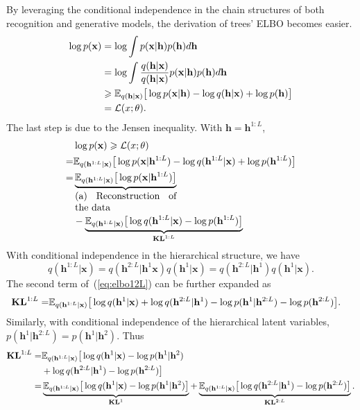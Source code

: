 \documentclass[sigconf, anonymous, review]{acmart}
\theoremstyle{plain}
\theoremstyle{definition}
\theoremstyle{remark}
\begin{document}
By leveraging  the conditional independence  in the chain structures of both recognition and generative models, the derivation of trees' ELBO becomes easier.
\begin{align*}
\log p(\mathbf{x}) &= \log \int p(\mathbf{x}|\mathbf{h})p(\mathbf{h}) d \mathbf{h} \\
&= \log \int \frac{q(\mathbf{h}|\mathbf{x})}{q(\mathbf{h}|\mathbf{x})} p(\mathbf{x}|\mathbf{h})p(\mathbf{h}) d \mathbf{h} \\
& \geqslant \mathbb{E}_{q(\mathbf{h}|\mathbf{x})}\big[ \log p(\mathbf{x}|\mathbf{h}) -  \log q(\mathbf{h}|\mathbf{x}) +  \log p(\mathbf{h}) \big]\\ \notag
&= \mathcal{L}(x; \theta).
\end{align*}%
The last step is due to the Jensen inequality. With $\mathbf{h} =\mathbf{h}^{1:L} $, 
\begin{align} \notag  %
&\log p(\mathbf{x})  \geqslant  \mathcal{L}(x; \theta) \\ \notag
=& \mathbb{E}_{q(\mathbf{h}^{1:L}|\mathbf{x})}\big[ \log p(\mathbf{x}|\mathbf{h}^{1:L}) -  \log q(\mathbf{h}^{1:L}|\mathbf{x}) +  \log p(\mathbf{h}^{1:L}) \big] \\ \label{eq:elbo12L}
=&  \underbrace{\mathbb{E}_{q(\mathbf{h}^{1:L}|\mathbf{x})}\big[ \log p(\mathbf{x}|\mathbf{h}^{1:L})\big]}_{\parbox{10.5em}{(a) Reconstruction of the data}}  \\ \notag
&-  \underbrace{\mathbb{E}_{q(\mathbf{h}^{1:L}|\mathbf{x})}\big[ \log q(\mathbf{h}^{1:L}|\mathbf{x}) - \log p(\mathbf{h}^{1:L}) \big] }_{\textbf{\text{KL}}^{1:L}}
\end{align}%
With conditional independence in   the hierarchical structure, we have 
$$q(\mathbf{h}^{1:L}|\mathbf{x})=q(\mathbf{h}^{2:L}|\mathbf{h}^1\mathbf{x})q(\mathbf{h}^{1}|\mathbf{x})=q(\mathbf{h}^{2:L}|\mathbf{h}^1)q(\mathbf{h}^{1}|\mathbf{x}).$$
The second term of~(\ref{eq:elbo12L}) can be further expanded as 
 \begin{align} \notag 
\textbf{\text{KL}}^{1:L} =&  \mathbb{E}_{q(\mathbf{h}^{1:L}|\mathbf{x})}\big[  \log q(\mathbf{h}^{1}|\mathbf{x})  +  \log q(\mathbf{h}^{2:L}|\mathbf{h}^{1})  - \log p(\mathbf{h}^{1}|\mathbf{h}^{2:L}) - \log p(\mathbf{h}^{2:L})  \big].
\end{align}%
Similarly, with conditional independence of the hierarchical latent variables, $ p(\mathbf{h}^{1}|\mathbf{h}^{2:L})= p(\mathbf{h}^{1}|\mathbf{h}^{2})$. Thus
 \begin{align} \notag 
\textbf{\text{KL}}^{1:L} =&  \mathbb{E}_{q(\mathbf{h}^{1:L}|\mathbf{x})}\big[  \log q(\mathbf{h}^{1}|\mathbf{x})   - \log p(\mathbf{h}^{1}|\mathbf{h}^{2})  \\
&+  \log q(\mathbf{h}^{2:L}|\mathbf{h}^{1})- \log p(\mathbf{h}^{2:L})  \big]\\ \notag
=&  \underbrace{\mathbb{E}_{q(\mathbf{h}^{1:L}|\mathbf{x})}\big[  \log q(\mathbf{h}^{1}|\mathbf{x})   - \log p(\mathbf{h}^{1}|\mathbf{h}^{2}) \big]}_{\mathbf{KL}^1}   + \underbrace{\mathbb{E}_{q(\mathbf{h}^{1:L}|\mathbf{x})}\big[  \log q(\mathbf{h}^{2:L}|\mathbf{h}^{1})- \log p(\mathbf{h}^{2:L})  \big]}_{\mathbf{KL}^{2:L}}.
\end{align}%
\end{document}
